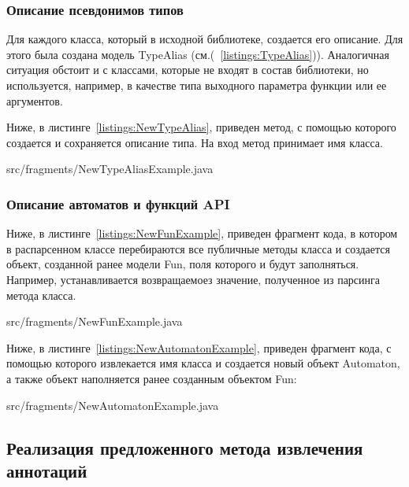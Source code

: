\subsubsection{Описание псевдонимов типов}

Для каждого класса, который в исходной библиотеке, создается его описание. Для этого была создана модель TypeAlias (см.(~\ref{listings:TypeAlias})).
Аналогичная ситуация обстоит и с классами, которые не входят в состав библиотеки, но используется, например, в качестве типа выходного параметра функции или ее аргументов.

Ниже, в листинге~\ref{listings:NewTypeAlias}, приведен метод, с помощью которого создается и сохраняется описание типа. На вход метод принимает имя класса.

{src/fragments/NewTypeAliasExample.java}

\subsubsection{Описание автоматов и функций API}

Ниже, в листинге~\ref{listings:NewFunExample}, приведен фрагмент кода, в котором в распарсенном классе перебираются все публичные методы класса и создается объект, созданной ранее модели Fun, поля которого и будут заполняться.
Например, устанавливается возвращаемоез значение, полученное из парсинга метода класса.

{src/fragments/NewFunExample.java}

Ниже, в листинге~\ref{listings:NewAutomatonExample}, приведен фрагмент кода, с помощью которого извлекается имя класса и создается новый объект Automaton, а также объект наполняется ранее созданным объектом Fun:

{src/fragments/NewAutomatonExample.java}

\subsection{Реализация предложенного метода извлечения аннотаций}


